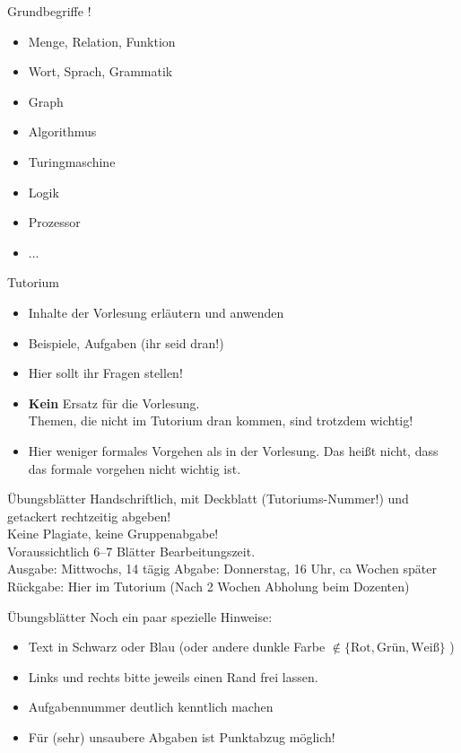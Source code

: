 \begin{frame} {Grundbegriffe !}
	\begin{itemize}
		\item Menge, Relation, Funktion
		\item Wort, Sprach, Grammatik
		\item Graph
		\item Algorithmus
		\item Turingmaschine
		\item Logik
		\item Prozessor
		\item ...
	\end{itemize}
\end{frame}

\begin{frame}[t]{Tutorium}
	\begin{itemize}[<+->]
		\item Inhalte der Vorlesung erläutern und anwenden
		\item Beispiele, Aufgaben (ihr seid dran!)
		\item Hier sollt ihr Fragen stellen!
		\item \textbf{Kein} Ersatz für die Vorlesung.\\
			  Themen, die nicht im Tutorium dran kommen, sind trotzdem wichtig!
		\item Hier weniger formales Vorgehen als in der Vorlesung. Das heißt nicht, dass das formale vorgehen nicht wichtig ist.
	\end{itemize}
\end{frame}

\begin{frame}{Übungsblätter}
	Handschriftlich, mit Deckblatt (Tutoriums-Nummer!) und getackert rechtzeitig	abgeben! \\ \pause
	Keine Plagiate, keine Gruppenabgabe! \\[1em] \pause
	Voraussichtlich 6--7 Blätter  Bearbeitungszeit. \\ \pause
	Ausgabe:  Mittwochs, 14 tägig
	Abgabe:   Donnerstag, 16 Uhr, ca  Wochen später
	Rückgabe: Hier im Tutorium (Nach 2 Wochen Abholung beim Dozenten)
\end{frame}

\begin{frame}{Übungsblätter}
	Noch ein paar spezielle Hinweise:
	\begin{itemize}
		\item Text in Schwarz oder Blau (oder andere dunkle Farbe $\notin \{\text{Rot}, \text{Grün}, \text{Weiß}\}$ )
		\item Links und rechts bitte jeweils einen Rand frei lassen.
		\item Aufgabennummer deutlich kenntlich machen
		\item Für (sehr) unsaubere Abgaben ist Punktabzug möglich!
	\end{itemize}
\end{frame}

